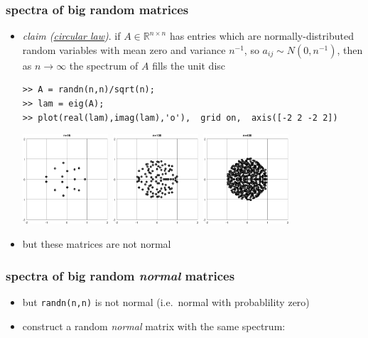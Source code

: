 \documentclass[10pt,hyperref]{beamer}
\newcommand{\RR}{\mathbb{R}}
\newcommand{\ds}{\displaystyle}
\begin{document}
\begin{frame}[fragile]
\frametitle{spectra of big random matrices}

\begin{itemize}
\item \emph{claim (\href{https://en.wikipedia.org/wiki/Circular_law}{circular law})}.  if $A\in \RR^{n\times n}$ has entries which are normally-distributed random variables with mean zero and variance $n^{-1}$, so $\ds a_{ij} \sim N(0,n^{-1})$, then as $n\to\infty$ the spectrum of $A$ fills the unit disc

\medskip
\begin{Verbatim}[fontsize=\footnotesize]
>> A = randn(n,n)/sqrt(n);
>> lam = eig(A);
>> plot(real(lam),imag(lam),'o'),  grid on,  axis([-2 2 -2 2])
\end{Verbatim}

\bigskip
\mbox{\includegraphics[width=0.25\textwidth]{figs/randnA16} \qquad \includegraphics[width=0.25\textwidth]{figs/randnA100} \qquad \includegraphics[width=0.25\textwidth]{figs/randnA400}}

\medskip
\item but these matrices are not normal
\end{itemize}
\end{frame}


\begin{frame}[fragile]
\frametitle{spectra of big random \emph{normal} matrices}

\begin{itemize}
\item but \texttt{randn(n,n)} is not normal (i.e.~normal with probablility zero)
\item construct a random \emph{normal} matrix with the same spectrum:

\bigskip
{}

\end{itemize}
\end{frame}
\end{document}
